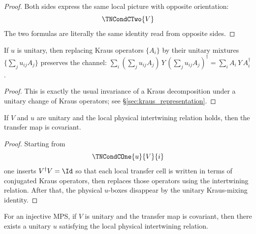 \begin{proof}
    \leanok
    Both sides express the same local picture with opposite orientation:
    \[
        \TNCondCTwo{V}
    \]
    The two formulas are literally the same identity read from opposite sides.
\end{proof}

\begin{lemma}\label{lem:unitary_kraus_mixing}
    \leanok
    If $u$ is unitary, then replacing Kraus operators $\{A_i\}$ by
    their unitary mixtures $\{\sum_j u_{ij} A_j\}$ preserves the
    channel: $\sum_i (\sum_j u_{ij} A_j)\, Y\, (\sum_j u_{ij} A_j)^\dagger
    = \sum_i A_i\, Y\, A_i^\dagger$.
\end{lemma}

\begin{proof}
    \leanok
    This is exactly the usual invariance of a Kraus decomposition under a
    unitary change of Kraus operators; see \S\ref{sec:kraus_representation}.
\end{proof}

\begin{theorem}\label{thm:condC1_imp_condC2}
    \leanok
    If $V$ and $u$ are unitary and the local physical intertwining
    relation holds, then the transfer map is covariant.
\end{theorem}

\begin{proof}
    \leanok
    Starting from
    \[
        \TNCondCOne{u}{V}{i}
    \]
    one inserts $V^\dagger V = \Id$ so that each local transfer cell is
    written in terms of conjugated Kraus operators, then replaces those
    operators using the intertwining relation. After that, the physical
    $u$-boxes disappear by the unitary Kraus-mixing identity.
\end{proof}

\begin{theorem}%
    \label{thm:condC2_imp_condC1_of_injective}
    \notready
    For an injective MPS, if $V$ is unitary and the transfer map is
    covariant, then there exists a unitary $u$ satisfying the local
    physical intertwining relation.
\end{theorem}

